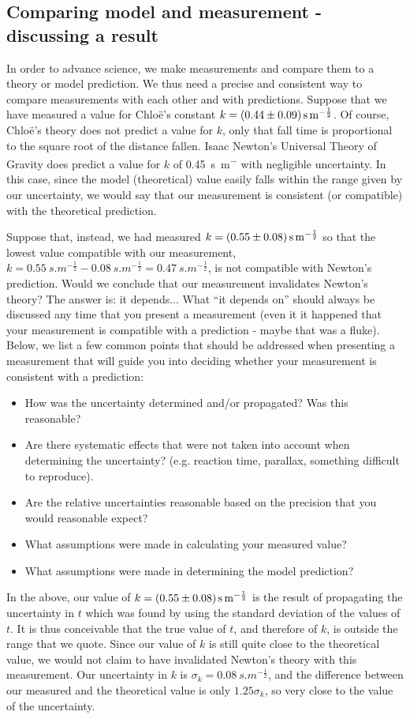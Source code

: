 \subsection{Comparing model and measurement - discussing a result}
In order to advance science, we make measurements and compare them to a theory or model prediction. We thus need a precise and consistent way to compare measurements with each other and with predictions. Suppose that we have measured a value for Chlo\"e's constant $k= \SI{0.44 \pm 0.09}{s.m^{-\frac{1}{2}}}$. Of course, Chlo\"e's theory does not predict a value for $k$, only that fall time is proportional to the square root of the distance fallen. Isaac Newton's Universal Theory of Gravity does predict a value for $k$ of \SI{0.45}{s.m^{-}} with negligible uncertainty. In this case, since the model (theoretical) value easily falls within the range given by our uncertainty, we would say that our measurement is consistent (or compatible) with the theoretical prediction. 

Suppose that, instead, we had measured $k=\SI{0.55 \pm 0.08}{s.m^{-\frac{1}{2}}}$ so that the lowest value compatible with our measurement, $k=\SI{0.55}{s.m^{-\frac{1}{2}}}-\SI{0.08}{s.m^{-\frac{1}{2}}}=\SI{0.47}{s.m^{-\frac{1}{2}}}$, is not compatible with Newton's prediction. Would we conclude that our measurement invalidates Newton's theory? The answer is: it depends... What ``it depends on'' should always be discussed any time that you present a measurement (even it it happened that your measurement is compatible with a prediction - maybe that was a fluke). Below, we list a few common points that should be addressed when presenting a measurement that will guide you into deciding whether your measurement is consistent with a prediction:
\begin{itemize}
\item How was the uncertainty determined and/or propagated? Was this reasonable?
\item Are there systematic effects that were not taken into account when determining the uncertainty? (e.g. reaction time, parallax, something difficult to reproduce).
\item Are the relative uncertainties reasonable based on the precision that you would reasonable expect?
\item What assumptions were made in calculating your measured value?
\item What assumptions were made in determining the model prediction? 
\end{itemize}
In the above, our value of $k= \SI{0.55 \pm 0.08}{s.m^{-\frac{1}{2}}}$ is the result of propagating the uncertainty in $t$ which was found by using the standard deviation of the values of $t$. It is thus conceivable that the true value of $t$, and therefore of $k$, is outside the range that we quote. Since our value of $k$ is still quite close to the theoretical value, we would not claim to have invalidated Newton's theory with this measurement. Our uncertainty in $k$ is $\sigma_k=\SI{0.08}{s.m^{-\frac{1}{2}}}$, and the difference between our measured and the theoretical value is only $1.25\sigma_k$, so very close to the value of the uncertainty. 

